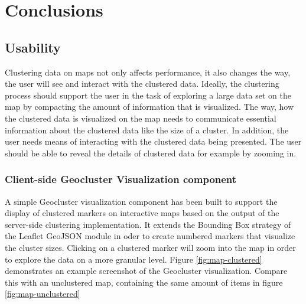 
%
%

\chapter{Conclusions}
\label{chapter:conclusions}



\section{Usability}
\label{chapter:objective-usability}

Clustering data on maps not only affects performance, it also changes the way, the user will see and interact with the clustered data. Ideally, the clustering process should support the user in the task of exploring a large data set on the map by compacting the amount of information that is visualized. The way, how the clustered data is visualized on the map needs to communicate essential information about the clustered data like the size of a cluster. In addition, the user needs means of interacting with the clustered data being presented. The user should be able to reveal the details of clustered data for example by zooming in. 




\subsection{Client-side Geocluster Visualization component}

A simple Geocluster visualization component has been built to support the display of clustered markers on interactive maps based on the output of the server-side clustering implementation. It extends the Bounding Box strategy of the Leaflet GeoJSON module in oder to create numbered markers that visualize the cluster sizes. Clicking on a clustered marker will zoom into the map in order to explore the data on a more granular level. Figure \ref{fig:map-clustered} demonstrates an example screenshot of the Geocluster visualization. Compare this with an unclustered map, containing the same amount of items in figure \ref{fig:map-unclustered}

